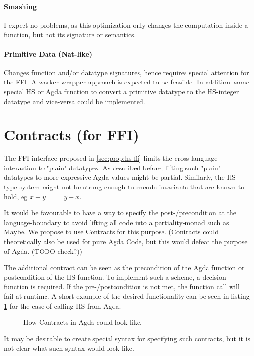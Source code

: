 \documentclass[12pt, a4paper, twoside]{report}
\begin{document}
\paragraph{Smashing}
I expect no problems, as this optimization only changes the computation inside a function, but not
its signature or semantics.

\paragraph{Primitive Data (Nat-like)}
Changes function and/or datatype signatures, hence requires special attention for the FFI.
A worker-wrapper approach is expected to be feasible. In addition, some special
HS or Agda function to convert a primitive datatype to the HS-integer datatype and vice-versa could be
implemented.

\section{Contracts (for FFI)}
The FFI interface proposed in \ref{sec:prop:hs-ffi} limits the cross-language interaction
to "plain" datatypes. As described before, lifting such "plain" datatypes to more expressive
Agda values might be partial. Similarly, the HS type system might not be strong enough
to encode invariants that are known to hold, eg $x + y == y + x$.

It would be favourable to have a way to specify the post-/precondition at the language-boundary
to avoid lifting all code into a partiality-monad such as Maybe.
We propose to use Contracts for this purpose. (Contracts could
theoretically also be used for pure Agda Code, but this would defeat the purpose of Agda. (TODO check?))

The additional contract can be seen as the precondition of the Agda function or postcondition of the
HS function. To implement such a scheme, a decision function is required. If the pre-/postcondition is not met,
the function call will fail at runtime. A short example of the desired functionality can be seen in listing \ref{lst:agda-con-ex}
for the case of calling HS from Agda.

\begin{figure}

\caption{How Contracts in Agda could look like.}
\label{lst:agda-con-ex}
\end{figure}

It may be desirable to create special syntax for specifying such contracts, but it is
not clear what such syntax would look like.
\end{document}
